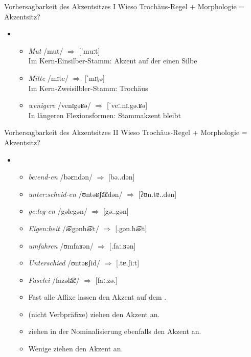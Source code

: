 \begin{frame}
  {Vorhersagbarkeit des Akzentsitzes I}
  \onslide<+->
  \onslide<+->
  Wieso Trochäus-Regel + Morphologie = Akzentsitz?\\
  \onslide<+->
  \Zeile
  \begin{itemize}[<+->]
    \item {}
      \Halbzeile
    \begin{itemize}[<+->]
      \item \textit{Mut} /mut/ \ensuremath{\Rightarrow} [ˈmuːt]\\
        Im Kern-Einsilber-Stamm: Akzent auf der \alert{einen Silbe}
        \Halbzeile
      \item \textit{Mitte} /mɪte/ \ensuremath{\Rightarrow} [ˈmɪṭə]\\
        Im Kern-Zweisilbler-Stamm: \alert{Trochäus}
        \Halbzeile
      \item \textit{wenigere} /venɪgəʁə/ \ensuremath{\Rightarrow} [ˈveː.nɪ.gə.ʁə]\\
        In längeren Flexionsformen: \alert{Stammakzent} bleibt
    \end{itemize}
  \end{itemize}
\end{frame}


\begin{frame}
  {Vorhersagbarkeit des Akzentsitzes II}
  \onslide<+->
  \onslide<+->
  Wieso Trochäus-Regel + Morphologie = Akzentsitz?\\
  \onslide<+->
  \Halbzeile
  \begin{itemize}[<+->]
    \item {}
    \begin{itemize}[<+->]
      \item \textit{be:end-en} /bəɛndən/ \ensuremath{\Rightarrow} [bə..dən]
      \item \textit{unter:scheid-en} /ʊntəʁʃa͡ɛdən/ \ensuremath{\Rightarrow} [ʔʊn.tɐ..dən]
      \item \textit{ge:leg-en} /gəlegən/ \ensuremath{\Rightarrow} [gə..gən]
      \item \textit{Eigen:heit} /a͡ɛgənha͡ɛt/ \ensuremath{\Rightarrow} [.gən.ha͡ɛt]
      \item \textit{umfahren} /ʊmfaʁən/ \ensuremath{\Rightarrow} [.faː.ʁən]
      \item \textit{Unterschied} /ʊntəʁʃid/ \ensuremath{\Rightarrow} [.tɐ.ʃiːt]
      \item \textit{Faselei} /fazəla͡ɛ/ \ensuremath{\Rightarrow} [faː.zə.]
        \Halbzeile
      \item Fast alle Affixe lassen den Akzent auf dem .
      \item {} (nicht Verbpräfixe) ziehen den Akzent an.
      \item {} ziehen in der Nominalisierung ebenfalls den Akzent an.
      \item Wenige  ziehen den Akzent an.
    \end{itemize}
  \end{itemize}
\end{frame}

